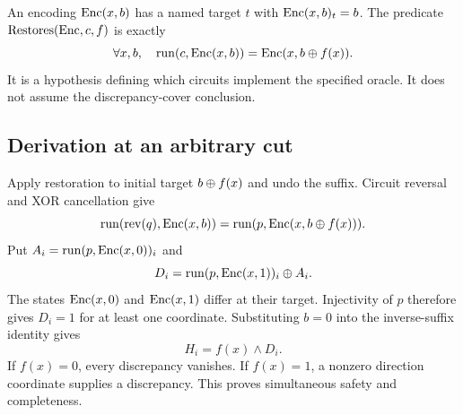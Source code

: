 \documentclass[11pt,letterpaper]{article}
\begin{document}
An encoding $\operatorname{Enc}(x,b)$ has a named target $t$ with $\operatorname{Enc}(x,b)_t=b$. The predicate $\operatorname{Restores}(\operatorname{Enc},c,f)$ is exactly
\[
\forall x,b,\quad\operatorname{run}(c,\operatorname{Enc}(x,b))=\operatorname{Enc}(x,b\oplus f(x)).
\]
It is a hypothesis defining which circuits implement the specified oracle. It does not assume the discrepancy-cover conclusion.

\subsection*{Derivation at an arbitrary cut}
Apply restoration to initial target $b\oplus f(x)$ and undo the suffix. Circuit reversal and XOR cancellation give
\[
\operatorname{run}(\operatorname{rev}(q),\operatorname{Enc}(x,b))=\operatorname{run}(p,\operatorname{Enc}(x,b\oplus f(x))).
\]
Put $A_i=\operatorname{run}(p,\operatorname{Enc}(x,0))_i$ and
\[
D_i=\operatorname{run}(p,\operatorname{Enc}(x,1))_i\oplus A_i.
\]
The states $\operatorname{Enc}(x,0)$ and $\operatorname{Enc}(x,1)$ differ at their target. Injectivity of $p$ therefore gives $D_i=1$ for at least one coordinate. Substituting $b=0$ into the inverse-suffix identity gives
\[
H_i=f(x)\land D_i.
\]
If $f(x)=0$, every discrepancy vanishes. If $f(x)=1$, a nonzero direction coordinate supplies a discrepancy. This proves simultaneous safety and completeness.
\end{document}
